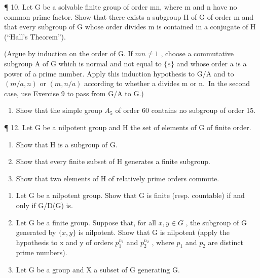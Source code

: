 ¶ 10. Let G be a solvable finite group of order mn, where m and n have no common prime factor. Show that there exists a subgroup H of G of order m and that every subgroup of G whose order divides m is contained in a conjugate of H (``Hall's Theorem'').

(Argue by induction on the order of G. If \(mn \neq 1\) , choose a commutative subgroup A of G which is normal and not equal to \(\{e\}\) and whose order a is a power of a prime number. Apply this induction hypothesis to G/A and to \((m/a, n)\) or \((m, n/a)\) according to whether a divides m or n.~In the second case, use Exercise 9 to pass from G/A to G.)

\begin{enumerate}
\def\labelenumi{\arabic{enumi}.}
\setcounter{enumi}{10}
\tightlist
\item
  Show that the simple group \(A_{5}\) of order 60 contains no subgroup of order 15.
\end{enumerate}

¶ 12. Let G be a nilpotent group and H the set of elements of G of finite order.

\begin{enumerate}
\def\labelenumi{(\alph{enumi})}
\item
  Show that H is a subgroup of G.
\item
  Show that every finite subset of H generates a finite subgroup.
\item
  Show that two elements of H of relatively prime orders commute.
\end{enumerate}

\begin{enumerate}
\def\labelenumi{\arabic{enumi}.}
\setcounter{enumi}{12}
\item
  Let G be a nilpotent group. Show that G is finite (resp. countable) if and only if G/D(G) is.
\item
  Let G be a finite group. Suppose that, for all \(x, y \in G\) , the subgroup of G generated by \(\{x, y\}\) is nilpotent. Show that G is nilpotent (apply the hypothesis to x and y of orders \(p_{1}^{n_{1}}\) and \(p_{2}^{n_{2}}\) , where \(p_{1}\) and \(p_{2}\) are distinct prime numbers).
\item
  Let G be a group and X a subset of G generating G.
\end{enumerate}


